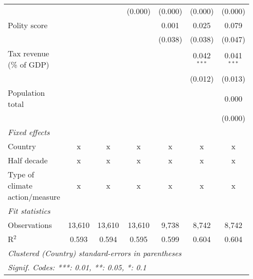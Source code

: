 \begin{tabular}{lcccccc}
                                                                                  &         &                & (0.000)        & (0.000)        & (0.000)        & (0.000)\\   
   Polity score                                                                   &         &                &                & 0.001          & 0.025          & 0.079\\   
                                                                                  &         &                &                & (0.038)        & (0.038)        & (0.047)\\   
   Tax revenue (\% of GDP)                                                        &         &                &                &                & 0.042$^{***}$  & 0.041$^{***}$\\   
                                                                                  &         &                &                &                & (0.012)        & (0.013)\\   
   Population total                                                               &         &                &                &                &                & 0.000\\   
                                                                                  &         &                &                &                &                & (0.000)\\   
   \emph{Fixed effects}\\
   Country                                                                        & x       & x              & x              & x              & x              & x\\  
   Half decade                                                                    & x       & x              & x              & x              & x              & x\\  
   Type of climate action/measure                                                 & x       & x              & x              & x              & x              & x\\  
   \midrule \emph{Fit statistics}\\
   Observations                                                                   & 13,610  & 13,610         & 13,610         & 9,738          & 8,742          & 8,742\\  
   R$^2$                                                                          & 0.593   & 0.594          & 0.595          & 0.599          & 0.604          & 0.604\\  
   \midrule
   \multicolumn{7}{l}{\emph{Clustered (Country) standard-errors in parentheses}}\\
   \multicolumn{7}{l}{\emph{Signif. Codes: ***: 0.01, **: 0.05, *: 0.1}}\\
\end{tabular}
\par\endgroup


